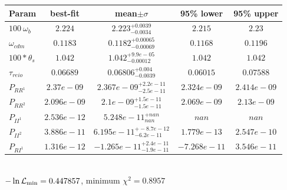 \begin{tabular}{|l|c|c|c|c|} 
 \hline 
Param & best-fit & mean$\pm\sigma$ & 95\% lower & 95\% upper \\ \hline 
$100~\omega_{b }$ &$2.224$ & $2.223_{-0.0034}^{+0.0039}$ & $2.215$ & $2.23$ \\ 
$\omega_{cdm }$ &$0.1183$ & $0.1182_{-0.00069}^{+0.00065}$ & $0.1168$ & $0.1196$ \\ 
$100*\theta_{s }$ &$1.042$ & $1.042_{-0.00012}^{+9.9e-05}$ & $1.042$ & $1.042$ \\ 
$\tau_{reio }$ &$0.06689$ & $0.06806_{-0.0039}^{+0.004}$ & $0.06015$ & $0.07588$ \\ 
$P_{{RR}^1 }$ &$2.37e-09$ & $2.367e-09_{-2.5e-11}^{+2.2e-11}$ & $2.324e-09$ & $2.414e-09$ \\ 
$P_{{RR}^2 }$ &$2.096e-09$ & $2.1e-09_{-1.5e-11}^{+1.5e-11}$ & $2.069e-09$ & $2.13e-09$ \\ 
$P_{{II}^1 }$ &$2.536e-12$ & $5.248e-11_{nan}^{+nan}$ & $nan$ & $nan$ \\ 
$P_{{II}^2 }$ &$3.886e-11$ & $6.195e-11_{-6.2e-11}^{+-8.7e-12}$ & $1.779e-13$ & $2.547e-10$ \\ 
$P_{{RI}^1 }$ &$1.316e-12$ & $-1.265e-11_{-1.9e-11}^{+2.4e-11}$ & $-7.268e-11$ & $3.546e-11$ \\ 
\hline 
 \end{tabular} \\ 
$-\ln{\cal L}_\mathrm{min} =0.447857$, minimum $\chi^2=0.8957$ \\ 
